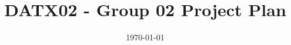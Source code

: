 

\title{DATX02 - Group 02 Project Plan}
\author{\groupmembers}
\date{\today}


\maketitle

\thispagestyle{empty}
\clearpage

\thispagestyle{empty}
\clearpage




